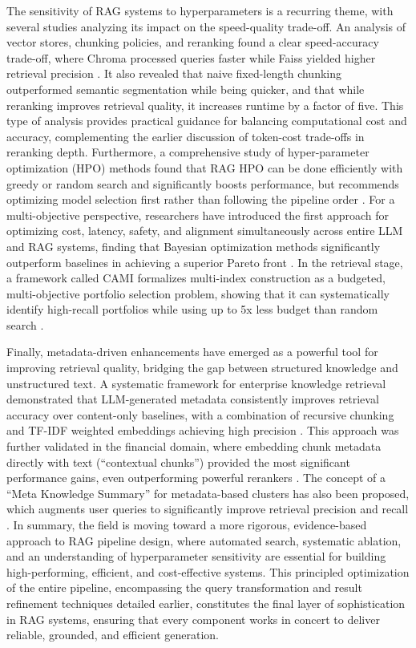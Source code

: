 \documentclass[11pt]{article}
\begin{document}
The sensitivity of RAG systems to hyperparameters is a recurring theme, with several studies analyzing its impact on the speed-quality trade-off. An analysis of vector stores, chunking policies, and reranking found a clear speed-accuracy trade-off, where Chroma processed queries faster while Faiss yielded higher retrieval precision \cite{ref148}. It also revealed that naive fixed-length chunking outperformed semantic segmentation while being quicker, and that while reranking improves retrieval quality, it increases runtime by a factor of five. This type of analysis provides practical guidance for balancing computational cost and accuracy, complementing the earlier discussion of token-cost trade-offs in reranking depth. Furthermore, a comprehensive study of hyper-parameter optimization (HPO) methods found that RAG HPO can be done efficiently with greedy or random search and significantly boosts performance, but recommends optimizing model selection first rather than following the pipeline order \cite{ref149}. For a multi-objective perspective, researchers have introduced the first approach for optimizing cost, latency, safety, and alignment simultaneously across entire LLM and RAG systems, finding that Bayesian optimization methods significantly outperform baselines in achieving a superior Pareto front \cite{ref150}. In the retrieval stage, a framework called CAMI formalizes multi-index construction as a budgeted, multi-objective portfolio selection problem, showing that it can systematically identify high-recall portfolios while using up to 5x less budget than random search \cite{ref151}.

Finally, metadata-driven enhancements have emerged as a powerful tool for improving retrieval quality, bridging the gap between structured knowledge and unstructured text. A systematic framework for enterprise knowledge retrieval demonstrated that LLM-generated metadata consistently improves retrieval accuracy over content-only baselines, with a combination of recursive chunking and TF-IDF weighted embeddings achieving high precision \cite{ref90}. This approach was further validated in the financial domain, where embedding chunk metadata directly with text (``contextual chunks'') provided the most significant performance gains, even outperforming powerful rerankers \cite{ref152}. The concept of a ``Meta Knowledge Summary'' for metadata-based clusters has also been proposed, which augments user queries to significantly improve retrieval precision and recall \cite{ref153}. In summary, the field is moving toward a more rigorous, evidence-based approach to RAG pipeline design, where automated search, systematic ablation, and an understanding of hyperparameter sensitivity are essential for building high-performing, efficient, and cost-effective systems. This principled optimization of the entire pipeline, encompassing the query transformation and result refinement techniques detailed earlier, constitutes the final layer of sophistication in RAG systems, ensuring that every component works in concert to deliver reliable, grounded, and efficient generation.
\end{document}
